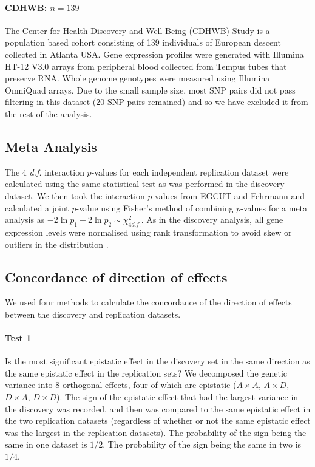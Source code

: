 \documentclass{article}
\begin{document}
\paragraph{CDHWB: $n=139$}
The Center for Health Discovery and Well Being (CDHWB) Study \cite{Preininger2013} is a population based cohort consisting of 139 individuals of European descent collected in Atlanta USA. Gene expression profiles were generated with Illumina HT-12 V3.0 arrays from peripheral blood collected from Tempus tubes that preserve RNA. Whole genome genotypes were measured using Illumina OmniQuad arrays. Due to the small sample size, most SNP pairs did not pass filtering in this dataset (20 SNP pairs remained) and so we have excluded it from the rest of the analysis.

\subsection{Meta Analysis}

The 4 \emph{d.f.} interaction $p$-values for each independent replication dataset were calculated using the same statistical test as was performed in the discovery dataset. We then took the interaction $p$-values from EGCUT and Fehrmann and calculated a joint $p$-value using Fisher's method of combining $p$-values for a meta analysis as $-2 \ln p_{1} - 2 \ln p_{2} \sim \chi^{2}_{4 d.f.}$. As in the discovery analysis, all gene expression levels were normalised using rank transformation to avoid skew or outliers in the distribution \cite{Westra2011}.


\subsection{Concordance of direction of effects}

We used four methods to calculate the concordance of the direction of effects between the discovery and replication datasets. 


\paragraph{Test 1} Is the most significant epistatic effect in the discovery set in the same direction as the same epistatic effect in the replication sets? We decomposed the genetic variance into 8 orthogonal effects, four of which are epistatic ($A \times A$, $A \times D$, $D \times A$, $D \times D$). The sign of the epistatic effect that had the largest variance in the discovery was recorded, and then was compared to the same epistatic effect in the two replication datasets (regardless of whether or not the same epistatic effect was the largest in the replication datasets). The probability of the sign being the same in one dataset is $1/2$. The probability of the sign being the same in two is $1/4$.
\end{document}
